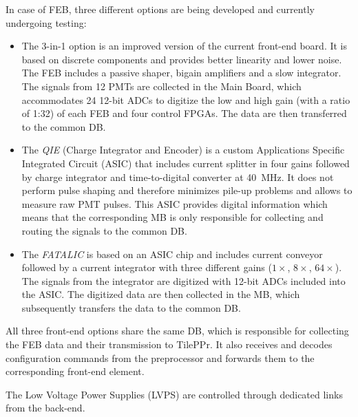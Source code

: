 \documentclass[10pt]{article}
\begin{document}
In case of FEB, three different options are being developed and currently undergoing testing:
\begin{itemize}
\item The {3-in-1} option \cite{2} is an improved version of the current front-end board. It is based on discrete components and provides better linearity and lower noise. The FEB includes a passive shaper, bigain amplifiers and a slow integrator. The signals from 12 PMTs are collected in the Main Board, which accommodates 24 12-bit ADCs to digitize the low and high gain (with a ratio of 1:32) of each FEB and four control FPGAs. The data are then transferred to the common DB. 
\item The \emph{QIE} (Charge Integrator and Encoder) is a custom Applications Specific Integrated Circuit (ASIC) that includes current splitter in four gains followed by charge integrator and time-to-digital converter at 40~MHz. 
It does not perform pulse shaping and therefore minimizes pile-up problems and allows to measure raw PMT pulses. 
This ASIC provides digital information which means that the corresponding MB is only responsible for collecting and routing the signals to the common DB. 
\item The \emph{FATALIC} is based on an ASIC chip and includes current conveyor followed by a current integrator with three different gains ($1\times$, $8\times$, $64\times$). The signals from the integrator are digitized with 12-bit ADCs included into the ASIC. The digitized data are then collected in the MB, which subsequently transfers the data to the common DB. 
\end{itemize}

All three front-end options share the same DB, which is responsible for collecting the FEB data and their transmission to TilePPr.
It also receives and decodes configuration commands from the preprocessor and forwards them to the corresponding front-end element. 

The Low Voltage Power Supplies (LVPS) are controlled through dedicated links from the back-end. 
\end{document}
